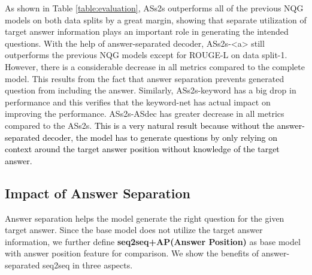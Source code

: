 \documentclass[letterpaper]{article} %
\newcommand{\hh}[1]{\textcolor{black}{#1}}
\begin{document}
As shown in Table \ref{table:evaluation}, ASs2s outperforms all of the previous NQG models on both data splits by a great margin, showing that separate utilization of target answer information plays an important role in generating the intended questions. With the help of answer-separated decoder, ASs2s-\textless a\textgreater{} still outperforms the previous NQG models except for ROUGE-L on data split-1. However, there is a considerable decrease in all metrics compared to the complete model. This results from the fact that answer separation prevents generated question from including the answer. Similarly, ASs2s-keyword has a big drop in performance and this verifies that the keyword-net has actual impact on improving the performance. ASs2s-ASdec has greater decrease in all metrics compared to the ASs2s. \hh{This is a very natural result because without the answer-separated decoder, the model has to generate questions by only relying on context around the target answer position without knowledge of the target answer.}
%
%
%
%
%
%
%
%
%
%
%
%


\subsection{Impact of Answer Separation}
Answer separation helps the model generate  the right question for the given target answer. Since the base model does not utilize the target answer information, we further define \textbf{seq2seq+AP(Answer Position)} as base model with answer position feature \cite{zhou2017neural} for comparison. We show the benefits of answer-separated seq2seq in three aspects.
\end{document}
